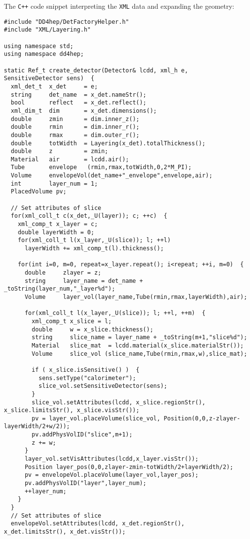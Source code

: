The \texttt{C++} code snippet interpreting the \texttt{XML} data and expanding the geometry:
\begin{verbatim}
#include "DD4hep/DetFactoryHelper.h"
#include "XML/Layering.h"

using namespace std;
using namespace dd4hep;

static Ref_t create_detector(Detector& lcdd, xml_h e, SensitiveDetector sens)  {
  xml_det_t  x_det     = e;
  string     det_name  = x_det.nameStr();
  bool       reflect   = x_det.reflect();
  xml_dim_t  dim       = x_det.dimensions();
  double     zmin      = dim.inner_z();
  double     rmin      = dim.inner_r();
  double     rmax      = dim.outer_r();
  double     totWidth  = Layering(x_det).totalThickness();
  double     z         = zmin;
  Material   air       = lcdd.air();
  Tube       envelope   (rmin,rmax,totWidth,0,2*M_PI);
  Volume     envelopeVol(det_name+"_envelope",envelope,air);
  int        layer_num = 1;
  PlacedVolume pv;

  // Set attributes of slice
  for(xml_coll_t c(x_det,_U(layer)); c; ++c)  {
    xml_comp_t x_layer = c;
    double layerWidth = 0;
    for(xml_coll_t l(x_layer,_U(slice)); l; ++l)
      layerWidth += xml_comp_t(l).thickness();

    for(int i=0, m=0, repeat=x_layer.repeat(); i<repeat; ++i, m=0)  {
      double     zlayer = z;
      string     layer_name = det_name + _toString(layer_num,"_layer%d");
      Volume     layer_vol(layer_name,Tube(rmin,rmax,layerWidth),air);
        
      for(xml_coll_t l(x_layer,_U(slice)); l; ++l, ++m)  {
        xml_comp_t x_slice = l;
        double     w = x_slice.thickness();
        string     slice_name = layer_name + _toString(m+1,"slice%d");
        Material   slice_mat  = lcdd.material(x_slice.materialStr());
        Volume     slice_vol (slice_name,Tube(rmin,rmax,w),slice_mat);
          
        if ( x_slice.isSensitive() )  {
          sens.setType("calorimeter");
          slice_vol.setSensitiveDetector(sens);
        }
        slice_vol.setAttributes(lcdd, x_slice.regionStr(), x_slice.limitsStr(), x_slice.visStr());
        pv = layer_vol.placeVolume(slice_vol, Position(0,0,z-zlayer-layerWidth/2+w/2));
        pv.addPhysVolID("slice",m+1);
        z += w;
      }
      layer_vol.setVisAttributes(lcdd,x_layer.visStr());
      Position layer_pos(0,0,zlayer-zmin-totWidth/2+layerWidth/2);
      pv = envelopeVol.placeVolume(layer_vol,layer_pos);
      pv.addPhysVolID("layer",layer_num);
      ++layer_num;
    }
  }
  // Set attributes of slice
  envelopeVol.setAttributes(lcdd, x_det.regionStr(), x_det.limitsStr(), x_det.visStr());


\end{verbatim}
